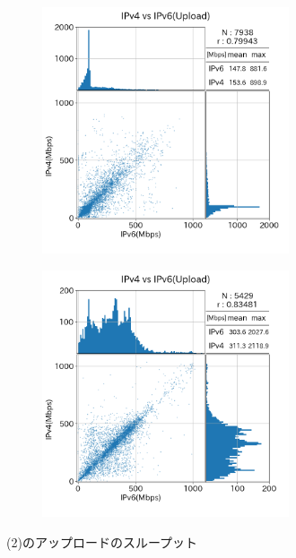 \begin{figure}[htbp]
\begin{center}
\begin{minipage}[t]{0.48\textwidth}
\begin{subfigure}[b]{\textwidth}
                \label{new_IPv4aaS_ul}
            \end{subfigure}
            \begin{subfigure}[b]{\textwidth}
                \centering
                \includegraphics[width=0.8\textwidth]{fig/new_mix_ul.png}
                \label{new_mix_ul}
            \end{subfigure}
            \begin{subfigure}[b]{\textwidth}
                \centering
                \includegraphics[width=0.8\textwidth]{fig/new_PPPoE_ul.png}
                \label{new_PPPoE_ul}
            \end{subfigure}
            \caption{(2)のアップロードのスループット}
            \label{fig:new_connect_ul}
        \end{minipage}
    \end{center}
\end{figure}
\FloatBarrier

